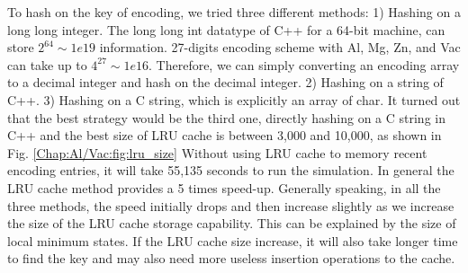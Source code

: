 To hash on the key of encoding, we tried three different methods: 1) Hashing on a long long integer. The long long int datatype of C++ for a 64-bit machine, can store $2^{64} \sim 1e19$ information. 27-digits encoding scheme with Al, Mg, Zn, and Vac can take up to $4^{27} \sim 1e16$. Therefore, we can simply converting an encoding array to a decimal integer and hash on the decimal integer. 2) Hashing on a string of C++. 3) Hashing on a C string, which is explicitly an array of char. It turned out that the best strategy would be the third one, directly hashing on a C string in C++ and the best size of \ac{LRU} cache is between 3,000 and 10,000, as shown in Fig. \ref{Chap:Al/Vac:fig:lru_size} Without using \ac{LRU} cache to memory recent encoding entries, it will take 55,135 seconds to run the simulation. In general the \ac{LRU} cache method provides a 5 times speed-up. Generally speaking, in all the three methods, the speed initially drops and then increase slightly as we increase the size of the \ac{LRU} cache storage capability. This can be explained by the size of local minimum states. If the \ac{LRU} cache size increase, it will also take longer time to find the key and may also need more useless insertion operations to the cache. 


